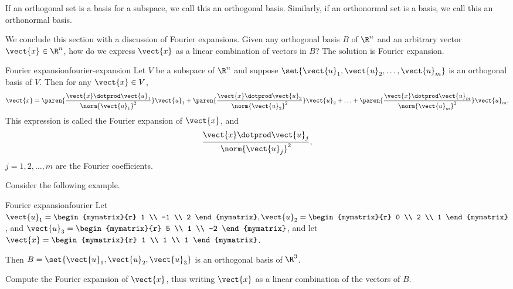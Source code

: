 If an orthogonal set is a basis for a subspace, we call this an
orthogonal basis. Similarly, if an orthonormal set is a basis, we call
this an orthonormal basis.

We conclude this section with a discussion of Fourier expansions. Given any orthogonal basis $B$ of $\R^n$ and an arbitrary vector $\vect{x} \in \R^n$, how do we express $\vect{x}$ as a linear combination of vectors in $B$? The solution is Fourier expansion.

\begin{theorem}{Fourier expansion}{fourier-expansion}
Let $V$ be a subspace of $\R^n$ and suppose $\set{\vect{u}_1, \vect{u}_2, \ldots, \vect{u}_m}$
is an orthogonal basis of $V$.
Then for any $\vect{x}\in V$,
\[ \vect{x} =
\paren{\frac{\vect{x}\dotprod \vect{u}_1}{\norm{\vect{u}_1}^2}} \vect{u}_1 +
\paren{\frac{\vect{x}\dotprod \vect{u}_2}{\norm{\vect{u}_2}^2}} \vect{u}_2 +
\ldots +
\paren{\frac{\vect{x}\dotprod \vect{u}_m}{\norm{\vect{u}_m}^2}} \vect{u}_m.
\]
This expression is called the Fourier expansion
of $\vect{x}$, and
\[ \frac{\vect{x}\dotprod \vect{u}_j}{\norm{\vect{u}_j}^2},\]
$j=1,2,\ldots,m$
are the Fourier coefficients.
\end{theorem}

Consider the following example.

\begin{example}{Fourier expansion}{fourier}
Let
$\vect{u}_1= \begin{mymatrix}{r} 1 \\ -1 \\ 2 \end{mymatrix},
\vect{u}_2= \begin{mymatrix}{r} 0 \\ 2 \\ 1  \end{mymatrix}$,
and
$\vect{u}_3 =\begin{mymatrix}{r} 5 \\ 1 \\ -2 \end{mymatrix}$,
and let
$\vect{x} =\begin{mymatrix}{r} 1 \\ 1 \\ 1 \end{mymatrix}$.

Then $B=\set{\vect{u}_1, \vect{u}_2, \vect{u}_3}$
is an orthogonal basis of $\R^3$.

Compute the Fourier expansion of $\vect{x}$, thus writing $\vect{x}$ as  a linear combination of the vectors of $B$.
\end{example}

